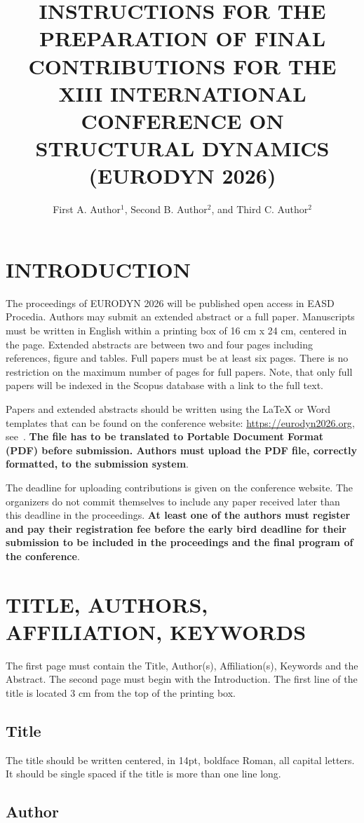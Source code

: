 \documentclass{eurodyn2026}
\title{INSTRUCTIONS FOR THE PREPARATION OF FINAL CONTRIBUTIONS FOR THE
XIII INTERNATIONAL CONFERENCE ON STRUCTURAL DYNAMICS (EURODYN 2026)}
\author{First A. Author$^1$, Second B. Author$^2$, and Third C. Author$^2$}
\begin{document}
\section{INTRODUCTION}

The proceedings of EURODYN 2026 will be published open access in EASD Procedia. Authors may submit an extended abstract or a full paper. Manuscripts must be written in English within a printing box of 16 cm x 24 cm,
centered in the page. Extended abstracts are between two and four pages including references, figure and tables. Full papers must be at least six pages. There is no restriction on the maximum number of pages for full papers. Note, that only full papers will be indexed in the Scopus database with a link to the full text.

Papers and extended abstracts should be written using the LaTeX or Word templates that can be found on the conference website: \url{https://eurodyn2026.org}, see~\cite{eurodyn2026website}.
\textbf{The file has to be translated to Portable Document Format (PDF) before
submission. Authors must upload the PDF file, correctly formatted, to the submission system}.

The deadline for uploading contributions is given on the conference website. The organizers do not commit themselves to include any paper
received later than this deadline in the proceedings. \textbf{At least one of the authors must register and pay their registration fee before the early bird deadline for their submission to be included in the proceedings and the final program of the conference}.

\section{TITLE, AUTHORS, AFFILIATION, KEYWORDS}

The first page must contain the Title, Author(s), Affiliation(s), Keywords
and the Abstract. The second page must begin with the Introduction. The first
line of the title is located 3 cm from the top of the printing box.

\subsection{Title}

The title should be written centered, in 14pt, boldface Roman, all capital
letters. It should be single spaced if the title is more than one line long.

\subsection{Author}
\end{document}
